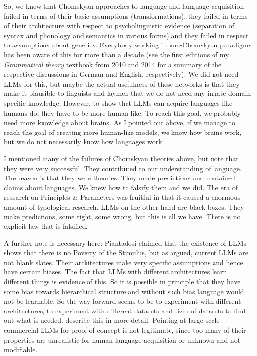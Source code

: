 So, we knew that Chomskyan approaches to language and language acquisition failed in terms of their
basic assumptions (transformations), they failed in terms of their architecture with respect to
psycholinguistic evidence (separation of syntax and phonology and semantics in various forms) and
they failed in respect to assumptions about genetics. Everybody working in non-Chomskyan paradigms
has been aware of this for more than a decade (see the first editions of my \emph{Grammatical
  theory} textbook from 2010 and 2014 for a summary of the respective discussions in German and
English, respectively). We did not need LLMs for this, but maybe the actual usefulness of these
networks is that they make it plausible to linguists and laymen that we do not need any innate
domain-specific knowledge. However, to show that LLMs can acquire languages like humans do, they
have to be more human-like. To reach this goal, we probably need more knowledge about brains. As I
pointed out above, if we manage to reach the goal of creating more human-like models, we know how
brains work, but we do not necessarily know how languages work.

I mentioned many of the failures of Chomskyan theories above, but note that they were very
successful. They contributed to our understanding of language. The reason is that they were
theories. They made predictions and contained claims about languages. We knew how to falsify them
and we did. The era of research on Principles \& Parameters was fruitful in that it caused a
enormous amount of typological research. LLMs on the other hand are black boxes. They make
predictions, some right, some wrong, but this is all we have. There is no explicit law that is falsified.

A further note is necessary here: Piantadosi claimed that the existence of LLMs shows that there is
no Poverty of the Stimulus, but as \citet[6]{Baroni2023a} argued, current LLMs are not blank
slates. Their architectures make very specific assumptions and hence have certain biases. The fact
that LLMs with different architectures learn different things is evidence of this. So it is
possible in principle that they have some bias towards hierarchical structure and without such bias
language would not be learnable. So the way forward seems to be to experiment with different
architectures, to experiment with different datasets and sizes of datasets to find out what is
needed. \citet{WB2022a} describe this in more detail. Pointing at large scale commercial LLMs for
proof of concept is not legitimate, since too many of their properties are unrealistic for human
language acquisition or unknown and not modifiable.

